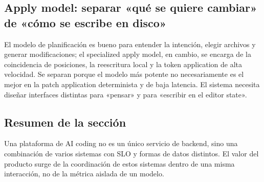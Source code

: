 \subsection{Apply model: separar «qué se quiere cambiar» de «cómo se escribe en disco»}

El modelo de planificación es bueno para entender la intención, elegir archivos y generar modificaciones; el specialized apply model, en cambio, se encarga de la coincidencia de posiciones, la reescritura local y la token application de alta velocidad. Se separan porque el modelo más potente no necesariamente es el mejor en la patch application determinista y de baja latencia. El sistema necesita diseñar interfaces distintas para «pensar» y para «escribir en el editor state».


\subsection{Resumen de la sección}

Una plataforma de AI coding no es un único servicio de backend, sino una combinación de varios sistemas con SLO y formas de datos distintos. El valor del producto surge de la coordinación de estos sistemas dentro de una misma interacción, no de la métrica aislada de un modelo.
